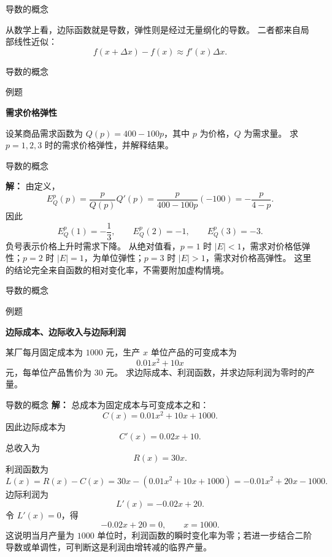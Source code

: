 \documentclass[aspectratio=169,10pt,fontset=fandol]{ctexbeamer}
\begin{document}
\begin{frame}[t,fragile]{导数的概念}
\footnotesize
{\footnotesize
从数学上看，边际函数就是导数，弹性则是经过无量纲化的导数。 二者都来自局部线性近似：
\[
f(x+\Delta x)-f(x)\approx f'(x)\Delta x.
\]


}
\end{frame}
\begin{frame}[t,fragile]{导数的概念}
\footnotesize
\begin{block}{例题}
{\footnotesize
\textbf{需求价格弹性}\par

设某商品需求函数为 $Q(p)=400-100p$，其中 $p$ 为价格，$Q$ 为需求量。 求 $p=1,2,3$ 时的需求价格弹性，并解释结果。

}
\end{block}
\end{frame}
\begin{frame}[t,fragile]{导数的概念}
\footnotesize
{\footnotesize
\textbf{解：}
由定义，
\[
E_Q^p(p)=\frac{p}{Q(p)}Q'(p)=\frac{p}{400-100p}(-100)=-\frac{p}{4-p}.
\]
因此
\[
E_Q^p(1)=-\frac13,\qquad E_Q^p(2)=-1,\qquad E_Q^p(3)=-3.
\]
负号表示价格上升时需求下降。 从绝对值看，$p=1$ 时 $|E|<1$，需求对价格低弹性；$p=2$ 时 $|E|=1$，为单位弹性；$p=3$ 时 $|E|>1$，需求对价格高弹性。 这里的结论完全来自函数的相对变化率，不需要附加虚构情境。

}
\end{frame}
\begin{frame}[t,fragile]{导数的概念}
\footnotesize
\begin{block}{例题}
{\footnotesize
\textbf{边际成本、边际收入与边际利润}\par

某厂每月固定成本为 $1000$ 元，生产 $x$ 单位产品的可变成本为
\[
0.01x^2+10x
\]
元，每单位产品售价为 $30$ 元。 求边际成本、利润函数，并求边际利润为零时的产量。

}
\end{block}
\end{frame}
\begin{frame}[t,fragile]{导数的概念}
\footnotesize
{\footnotesize
\textbf{解：}
总成本为固定成本与可变成本之和：
\[
C(x)=0.01x^2+10x+1000.
\]
因此边际成本为
\[
C'(x)=0.02x+10.
\]
总收入为
\[
R(x)=30x.
\]
利润函数为
\[
L(x)=R(x)-C(x)=30x-(0.01x^2+10x+1000)
=-0.01x^2+20x-1000.
\]
边际利润为
\[
L'(x)=-0.02x+20.
\]
令 $L'(x)=0$，得
\[
-0.02x+20=0,\qquad x=1000.
\]
这说明当月产量为 $1000$ 单位时，利润函数的瞬时变化率为零；若进一步结合二阶导数或单调性，可判断这是利润由增转减的临界产量。
}
\end{frame}
\end{document}
